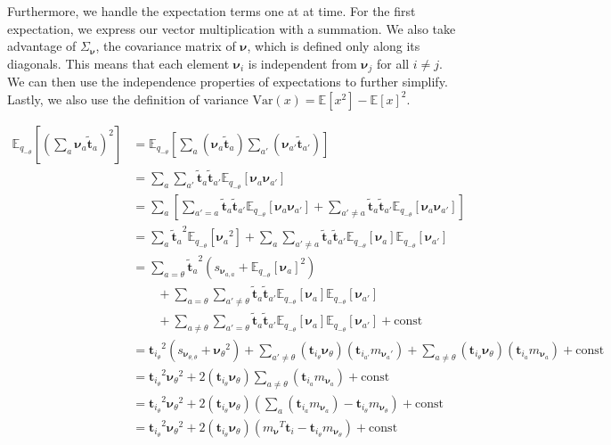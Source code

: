 \documentclass[letterpaper,12pt]{article}
\newcommand{\lp}{\left (} %
\newcommand{\rp}{\right )} %
\newcommand{\lb}{\left [} %
\newcommand{\rb}{\right ]} %
\newcommand{\nuv}{\boldsymbol{\nu}} %
\newcommand{\ti}{\boldsymbol{t}_i} %
\newcommand{\ttilde}{\ensuremath{\tilde{\boldsymbol{t}}}} %
\newcommand{\Sigmanu}{\Sigma_{\nuv}} %
\newcommand{\mnu}{\ensuremath{m_\nuv}} %
\newcommand{\nua}{\ensuremath{\nuv_a}} %
\newcommand{\tatilde}{\ensuremath{\ttilde_a}} %
\newcommand{\nuaprime}{\ensuremath{\nuv_{a'}}} %
\newcommand{\taprimetilde}{\ensuremath{\ttilde_{a'}}} %
\newcommand{\tia}{\ensuremath{\boldsymbol{t}_{i_a}}} %
\newcommand{\tiaprime}{\ensuremath{\boldsymbol{t}_{i_{a'}}}} %
\newcommand{\tthetatilde}{\ensuremath{\boldsymbol{t}_{i_\theta}}} %
\newcommand{\nutheta}{\ensuremath{\nuv_\theta}} %
\newcommand{\mnusub}[1]{\ensuremath{m_{\nuv_#1}}} %
\newcommand{\snusub}[1]{\ensuremath{s_{\nuv_#1}}} %
\newcommand{\Etheta}{\ensuremath{\mathbb{E}_{q_{-\theta}}}} %
\begin{document}
Furthermore, we handle the expectation terms one at at time. For the first expectation, we express our vector multiplication with a summation. We also take advantage of $\Sigmanu$, the covariance matrix of $\nuv$, which is defined only along its diagonals. This means that each element $\nuv_i$ is independent from $\nuv_j$ for all $i \neq j$. We can then use the independence properties of expectations to further simplify. Lastly, we also use the definition of variance $\text{Var}(x) = \mathbb{E}\lb x^2 \rb - \mathbb{E} \lb x \rb ^2$. 

\begin{equation}
\begin{split}
    \Etheta \lb \lp \sum_a \nua \tatilde \rp^2 \rb &= \Etheta \lb \sum_a  \lp \nua \tatilde \rp \sum_{a'} \lp \nuaprime \taprimetilde \rp \rb \\
    &= \sum_a \sum_{a'} \tatilde \taprimetilde \Etheta \lb \nua \nuaprime \rb \\
    &= \sum_a \lb \sum_{a' = a} \tatilde \taprimetilde \Etheta \lb \nua \nuaprime \rb + \sum_{a' \neq a} \tatilde \taprimetilde \Etheta \lb \nua \nuaprime \rb \rb \\
    &= \sum_a \tatilde^2 \Etheta \lb \nua^2 \rb + \sum_a \sum_{a' \neq a} \tatilde \taprimetilde \Etheta \lb \nua \rb \Etheta \lb \nuaprime \rb  \\
    &= \sum_{a=\theta} \tatilde^2 \lp \snusub{{a, a}} + \Etheta \lb \nua \rb^2 \rp \\
    & \qquad + \sum_{a=\theta} \sum_{a' \neq \theta} \tatilde \taprimetilde \Etheta \lb \nua \rb \Etheta \lb \nuaprime \rb\\
    & \qquad + \sum_{a \neq \theta} \sum_{a' = \theta} \tatilde \taprimetilde \Etheta \lb \nua \rb \Etheta \lb \nuaprime \rb  + \text{const} \\
    &= \tthetatilde^2 \lp \snusub{{\theta, \theta}} + \nutheta^2 \rp + \sum_{a' \neq \theta} \lp \tthetatilde \nutheta \rp \lp \tiaprime \mnusub{a'} \rp + \sum_{a \neq \theta} \lp \tthetatilde \nutheta \rp \lp \tia \mnusub{a} \rp + \text{const} \\
    &= \tthetatilde^2 \nutheta^2 + 2 \lp \tthetatilde \nutheta \rp \sum_{a \neq \theta} \lp \tia \mnusub{a} \rp + \text{const} \\
    &= \tthetatilde^2 \nutheta^2 + 2 \lp \tthetatilde \nutheta \rp \lp \sum_{a} \lp \tia \mnusub{a} \rp - \ti_\theta \mnusub{\theta}  \rp + \text{const} \\
    &= \tthetatilde^2 \nutheta^2 + 2 \lp \tthetatilde \nutheta \rp \lp {\mnu}^T \ti - \ti_\theta \mnusub{\theta}  \rp + \text{const} 
\end{split}
\end{equation}
\end{document}
